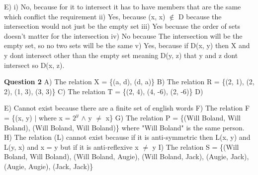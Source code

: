 \documentclass{article}
\begin{document}
E) i) No, because for it to intersect it has to have members that are the same which conflict the requirement\newline
ii) Yes, because (x, x) $\notin$ D because the intersection would not just be the empty set\newline
iii) Yes becuase the order of sets doesn't matter for the intersection\newline
iv) No because The intersection will be the empty set, so no two sets will be the same \newline
v) Yes, because if D(x, y) then X and y dont intersect other than the empty set meaning D(y, z) that y and z dont intersect so D(x, z).\newline\newline

\textbf{Question 2}\newline
A) The relation X = \{(a, d), (d, a)\}\newline
B) The relation R = \{(2, 1), (2, 2), (1, 3), (3, 3)\}\newline
C) The relation T = \{(2, 4), (4, -6), (2, -6)\}\newline
D) \newline
{}\newline
E) Cannot exist because there are a finite set of english words\newline\newline
F) The relation F = \{(x, y) $\mid$ where x = ${2}^y$ $\wedge$ y $\neq$ x\}\newline
G) The relation P = \{(Will Boland, Will Boland), (Will Boland, Will Boland)\} where "Will Boland" is the same person.\newline
H) The relation (L) cannot exist because if it is anti-symmetric then L(x, y) and L(y, x) and x = y but if it is anti-reflexive x $\neq$ y\newline
I) The relation S = \{(Will Boland, Will Boland), (Will Boland, Augie), (Will Boland, Jack), (Augie, Jack), (Augie, Augie), (Jack, Jack)\}\newline\newline
\end{document}

